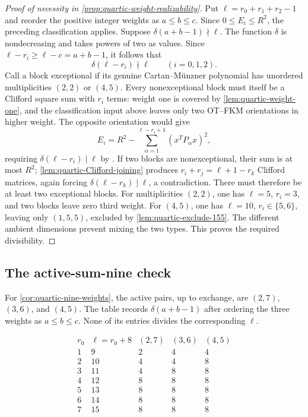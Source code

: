\begin{proof}[Proof of necessity in \cref{prop:quartic-weight-realizability}]
Put $\ell=r_0+r_1+r_2-1$ and reorder the positive integer weights
as $a\le b\le c$. Since $0\le E_i\le R^2$, the preceding
classification applies. Suppose $\delta(a+b-1)\nmid\ell$.
The function $\delta$ is nondecreasing and takes powers of two as
values. Since $\ell-r_i\ge\ell-c=a+b-1$, it follows that
\[
 \delta(\ell-r_i)\nmid\ell\qquad(i=0,1,2).
\]
Call a block exceptional if its genuine Cartan--M\"unzner polynomial
has unordered multiplicities $(2,2)$ or $(4,5)$.
Every nonexceptional block must itself be a Clifford square sum with
$r_i$ terms: weight one is covered by \cref{lem:quartic-weight-one},
and the classification input above leaves only two OT--FKM
orientations in higher weight. The opposite orientation would give
\[
 E_i=R^2-\sum_{\alpha=1}^{\ell-r_i+1}(x^TP_\alpha x)^2,
\]
requiring $\delta(\ell-r_i)\mid\ell$ by
\cite[Section~3.5]{FKM81}.
If two blocks are nonexceptional, their sum is at most $R^2$;
\cref{lem:quartic-Clifford-joining} produces
$r_i+r_j=\ell+1-r_k$ Clifford matrices,
again forcing $\delta(\ell-r_k)\mid\ell$, a contradiction.
There must therefore be at least two exceptional blocks.
For multiplicities $(2,2)$, one has $\ell=5$, $r_i=3$, and two
blocks leave zero third weight. For $(4,5)$, one has $\ell=10$,
$r_i\in\{5,6\}$, leaving only $(1,5,5)$, excluded by
\cref{lem:quartic-exclude-155}. The different ambient dimensions
prevent mixing the two types. This proves the required divisibility.
\end{proof}

\subsection{The active-sum-nine check}

For \cref{cor:quartic-nine-weights}, the active pairs, up to exchange,
are $(2,7)$, $(3,6)$, and $(4,5)$. The table records
$\delta(a+b-1)$ after ordering the three weights as $a\leq b\leq c$.
None of its entries divides the corresponding $\ell$.
\begin{table}[htbp]
\centering
\caption{The excluded weights $1\leq r_0\leq7$ when $r_1+r_2=9$.}
\label{tab:quartic-nine-low-weights}
\[
\begin{array}{c|c|ccc}
 r_0&\ell=r_0+8&(2,7)&(3,6)&(4,5)\\ \hline
 1&9 &2&4&4\\
 2&10&4&4&8\\
 3&11&4&8&8\\
 4&12&8&8&8\\
 5&13&8&8&8\\
 6&14&8&8&8\\
 7&15&8&8&8
\end{array}
\]
\end{table}
